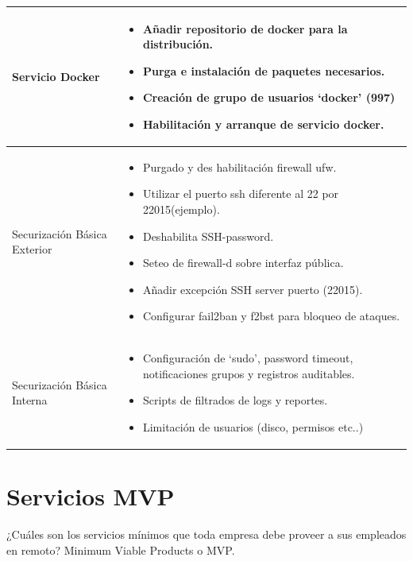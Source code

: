 \begin{longtable}[!ht]{|p{4cm}|p{10cm}|}
         Servicio Docker &
        \begin{itemize}
            \item Añadir repositorio de docker para la distribución.
            \item Purga e instalación de paquetes necesarios.
            \item Creación de grupo de usuarios ‘docker’ (997)
            \item Habilitación y arranque de servicio docker.
        \end{itemize}
        \\ \hline

        Securización Básica Exterior &
        \begin{itemize}
            \item Purgado y des habilitación firewall ufw.
            \item Utilizar el puerto ssh diferente al 22 por 22015(ejemplo).
            \item Deshabilita SSH-password.
            \item Seteo de firewall-d sobre interfaz pública.
            \item Añadir excepción SSH server puerto (22015).
            \item Configurar fail2ban y f2bst para bloqueo de ataques.
        \end{itemize}
        \\ \hline

        Securización Básica Interna &
        \begin{itemize}
            \item Configuración de ‘sudo’,  password timeout, notificaciones grupos y registros auditables.
            \item Scripts de filtrados de logs y reportes.
            \item Limitación de usuarios (disco, permisos etc..)
        \end{itemize}
        \\ \hline
       
\end{longtable}

\section{Servicios MVP}\label{S:anexo_mvp}
¿Cuáles son los servicios mínimos que toda empresa debe proveer a sus empleados en remoto? Minimum Viable Products o MVP.

